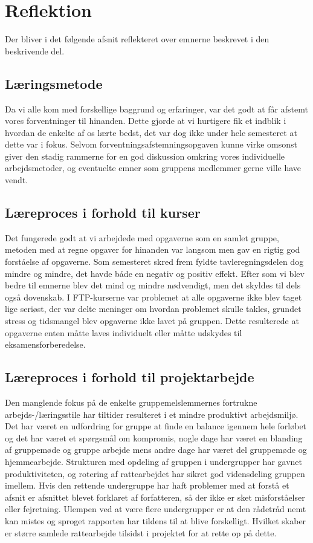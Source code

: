 \section{Reflektion}
Der bliver i det følgende afsnit reflekteret over emnerne beskrevet i den beskrivende del.
\subsection{Læringsmetode}
Da vi alle kom med forskellige baggrund og erfaringer, var det godt at får afstemt vores forventninger til hinanden. Dette gjorde at vi hurtigere fik et indblik i hvordan de enkelte af os lærte bedst, det var dog ikke under hele semesteret at dette var i fokus. Selvom forventningsafstemningsopgaven kunne virke omsonst giver den stadig rammerne for en god diskussion omkring vores individuelle arbejdsmetoder, og eventuelte emner som gruppens medlemmer gerne ville have vendt.  
\subsection{Læreproces i forhold til kurser}
Det fungerede godt at vi arbejdede med opgaverne som en samlet gruppe, metoden med at regne opgaver for hinanden var langsom men gav en rigtig god forståelse af opgaverne. Som semesteret skred frem fyldte tavleregningsdelen dog mindre og mindre, det havde både en negativ og positiv effekt. Efter som vi blev bedre til emnerne blev det mind og mindre nødvendigt, men det skyldes til dels også dovenskab. I FTP-kurserne var problemet at alle opgaverne ikke blev taget lige seriøst, der var delte meninger om hvordan problemet skulle takles, grundet stress og tidsmangel blev opgaverne ikke lavet på gruppen. Dette resulterede at opgaverne enten måtte laves individuelt eller måtte udskydes til eksamensforberedelse. 
\subsection{Læreproces i forhold til projektarbejde}
Den manglende fokus på de enkelte gruppemelslemmernes fortrukne arbejds-/læringsstile har tiltider resulteret i et mindre produktivt arbejdsmiljø. Det har været en udfordring for gruppe at finde en balance igennem hele forløbet og det har været et spørgsmål om kompromis, nogle dage har været en blanding af gruppemøde og gruppe arbejde mens andre dage har været del gruppemøde og hjemmearbejde. Strukturen med opdeling af gruppen i undergrupper har gavnet produktiviteten, og rotering af rattearbejdet har sikret god vidensdeling gruppen imellem. Hvis den rettende undergruppe har haft problemer med at forstå et afsnit er afsnittet blevet forklaret af forfatteren, så der ikke er sket misforståelser eller fejretning. Ulempen ved at være flere undergrupper er at den rådetråd nemt kan mistes og sproget rapporten har tildens til at blive forskelligt. Hvilket skaber er større samlede rattearbejde tilsidst i projektet for at rette op på dette. 

